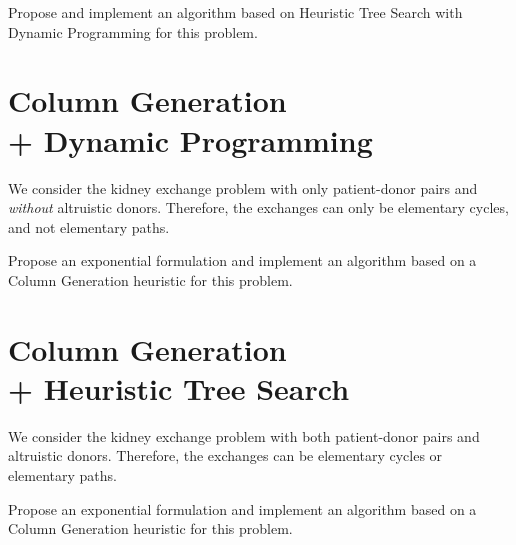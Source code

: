 \documentclass[a4paper,twocolumn]{article}
\begin{document}
Propose and implement an algorithm based on Heuristic Tree Search with Dynamic Programming for this problem.

\section{Column Generation \texorpdfstring{\\}{}  + Dynamic Programming}

We consider the kidney exchange problem with only patient-donor pairs and \emph{without} altruistic donors. Therefore, the exchanges can only be elementary cycles, and not elementary paths.

Propose an exponential formulation and implement an algorithm based on a Column Generation heuristic for this problem.

\section{Column Generation \texorpdfstring{\\}{} + Heuristic Tree Search}

We consider the kidney exchange problem with both patient-donor pairs and altruistic donors. Therefore, the exchanges can be elementary cycles or elementary paths.

Propose an exponential formulation and implement an algorithm based on a Column Generation heuristic for this problem.

\printbibliography%
\end{document}
